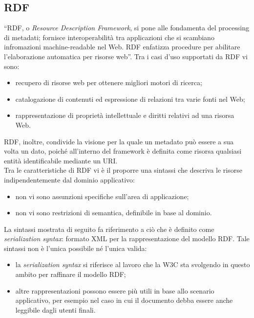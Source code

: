 \documentclass[12pt,a4paper,twoside]{book}
\begin{document}
\subsection{RDF}
``RDF, o \textit{Resource Description Framework}, si pone alle fondamenta del processing di metadati; fornisce interoperabilità tra applicazioni che si scambiano infromazioni machine-readable nel Web. RDF enfatizza procedure per abilitare l'elaborazione automatica per risorse web''\cite{RDF}. Tra i casi d'uso supportati da RDF vi sono:
\begin{itemize}
\item recupero di risorse web per ottenere migliori motori di ricerca;
\item catalogazione di contenuti ed espressione di relazioni tra varie fonti nel Web;
\item rappresentazione di proprietà intellettuale e diritti relativi ad una risorsa Web.
\end{itemize}
RDF, inoltre, condivide la visione per la quale un metadato può essere a sua volta un dato, poiché all'interno del framework è definita come risorsa qualsiasi entità identificabile mediante un URI.\\
Tra le caratteristiche di RDF vi è il proporre una sintassi che descriva le risorse indipendentemente dal dominio applicativo: 
\begin{itemize}
\item non vi sono assunzioni specifiche sull'area di applicazione;
\item non vi sono restrizioni di semantica, definibile in base al dominio.
\end{itemize}
La sintassi mostrata di seguito fa riferimento a ciò che è definito come \textit{serialization syntax}: formato XML per la rappresentazione del modello RDF. Tale sintassi non è l'unica possibile né l'unica valida:
\begin{itemize}
\item la \textit{serialization syntax} si riferisce al lavoro che la W3C sta svolgendo in questo ambito per raffinare il modello RDF;
\item altre rappresentazioni possono essere più utili in base allo scenario applicativo, per esempio nel caso in cui il documento debba essere anche leggibile dagli utenti finali.
\end{itemize}
\end{document}

